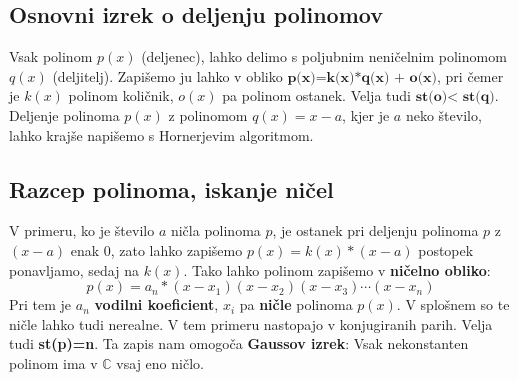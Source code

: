 \subsection{Osnovni izrek o deljenju polinomov}
Vsak polinom $p(x)$ (deljenec), lahko delimo s poljubnim neničelnim polinomom $q(x)$ (deljitelj). Zapišemo ju lahko v obliko $\textbf{p(x)=k(x)*q(x) + o(x)}$, pri čemer je $k(x)$ polinom količnik, $o(x)$ pa polinom ostanek. Velja tudi $\textbf{st(o)< st(q)}$. Deljenje polinoma $p(x)$ z polinomom $q(x)=x-a$, kjer je $a$ neko število, lahko krajše napišemo s Hornerjevim algoritmom.
\subsection{Razcep polinoma, iskanje ničel}
V primeru, ko je število $a$ ničla polinoma $p$, je ostanek pri deljenju polinoma $p$ z $(x-a)$ enak $0$, zato lahko zapišemo $p(x)= k(x)*(x-a)$ postopek ponavljamo, sedaj na $k(x)$. Tako lahko polinom zapišemo v \textbf{ničelno obliko}: 
\[
p(x)= a_n*(x-x_1)(x-x_2)(x-x_3)\cdots(x-x_n)
\]
Pri tem je $a_n$ \textbf{vodilni koeficient}, $x_i$ pa \textbf{ničle} polinoma $p(x)$. V splošnem so te ničle lahko tudi nerealne. V tem primeru nastopajo v konjugiranih parih. Velja tudi \textbf{st(p)=n}. Ta zapis nam omogoča \textbf{Gaussov izrek}: Vsak nekonstanten polinom ima v $\mathbb{C}$ vsaj eno ničlo.

